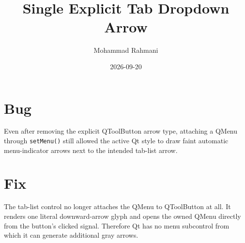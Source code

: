 \documentclass[a4paper]{article}
\title{Single Explicit Tab Dropdown Arrow}
\date{2026-09-20}
\author{Mohammad Rahmani}
\begin{document}
   \maketitle

   \begin{preview}
      \section{Bug}
      Even after removing the explicit QToolButton arrow type, attaching a
      QMenu through \texttt{setMenu()} still allowed the active Qt style to
      draw faint automatic menu-indicator arrows next to the intended tab-list
      arrow.

      \section{Fix}
      The tab-list control no longer attaches the QMenu to QToolButton at all.
      It renders one literal downward-arrow glyph and opens the owned QMenu
      directly from the button's clicked signal.  Therefore Qt has no menu
      subcontrol from which it can generate additional gray arrows.
   \end{preview}

   
   
\end{document}

